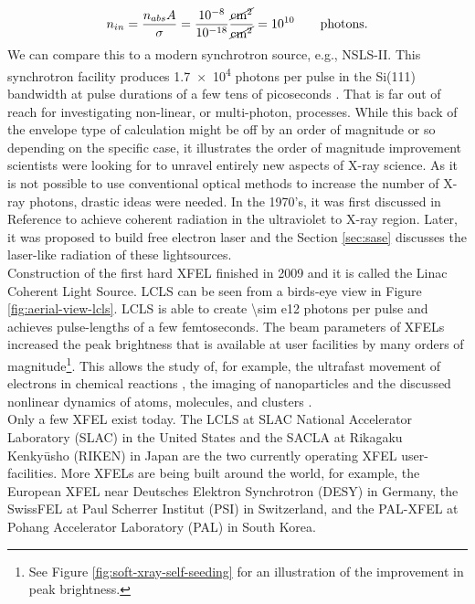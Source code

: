 \begin{equation}
n_{in} = \frac{n_{abs} A}{\sigma} = \frac{10^{-8}}{10^{-18}}\si[per-mode = fraction]{\cancel\square\centi\meter\per\cancel\square\centi\meter}=10^{10}\qquad \mathrm{photons.}
\label{eq:absorption-cross-section}
\end{equation}
We can compare this to a modern synchrotron source, e.g., NSLS-II. This synchrotron facility produces \num{1.7e4} photons per pulse in the Si(111) bandwidth at pulse durations of a few tens of picoseconds \citep{Williams-2016-PC}. That is far out of reach for investigating non-linear, or multi-photon, processes. While this back of the envelope type of calculation might be off by an order of magnitude or so depending on the specific case, it illustrates the order of magnitude improvement scientists were looking for to unravel entirely new aspects of X-ray science. As it is not possible to use conventional optical methods to increase the number of X-ray photons, drastic ideas were needed. In the 1970's, it was first discussed in Reference \citep{Madey-1971-JAP} to achieve coherent radiation in the ultraviolet to X-ray region. Later, it was proposed to build free electron laser \citep{Kondratenko-1980-PA,Bonifacio-1984-OC} and the Section \ref{sec:sase} discusses the laser-like radiation of these lightsources.\\[1\baselineskip]
%
Construction of the first hard XFEL finished in 2009 and it is called the Linac Coherent Light Source. LCLS can be seen from a birds-eye view in Figure \ref{fig:aerial-view-lcls}. LCLS is able to create \num{\sim e12} photons per pulse and achieves pulse-lengths of a few femtoseconds. The beam parameters of XFELs increased the peak brightness that is available at user facilities by many orders of magnitude\footnote{See Figure \ref{fig:soft-xray-self-seeding} for an illustration of the improvement in peak brightness.}. This allows the study of, for example, the ultrafast movement of electrons in chemical reactions \citep{Dell'Angela-2013-Science,Picon-2016-NatComm}, the imaging of nanoparticles \citep{Chapman-2011-Nature,Seibert-2011-Nature} and the discussed nonlinear dynamics of atoms, molecules, and clusters \citep{Young-2010-Nature,Rohringer-2012-Nature,Berrah-2011-PNAS,Gorkhover-2012-PRL}.\\[1\baselineskip]
%
Only a few XFEL exist today. The LCLS at SLAC National Accelerator Laboratory (SLAC) in the United States and the SACLA at Rikagaku Kenkyūsho (RIKEN) in Japan are the two currently operating XFEL user-facilities. More XFELs are being built around the world, for example, the European XFEL near Deutsches Elektron Synchrotron (DESY) in Germany, the SwissFEL at Paul Scherrer Institut (PSI) in Switzerland, and the PAL-XFEL at Pohang Accelerator Laboratory (PAL) in South Korea.
%
%
%
